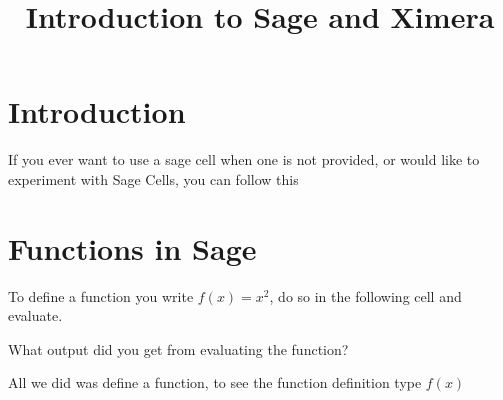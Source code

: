 \documentclass{ximera}
\title{Introduction to Sage and Ximera}
\begin{document}
\maketitle
\section{Introduction}
If you ever want to use a sage cell when one is not provided, or would like to experiment with Sage Cells, you can follow this 
\section{Functions in Sage}
To define a function you write $f(x)=x^2$, do so in the following cell and evaluate.
\begin{onlineOnly}
\begin{sageCell}

\end{sageCell}
\end{onlineOnly}
\begin{question}
What output did you get from evaluating the function?
\begin{multipleChoice}
\end{multipleChoice}
\begin{feedback}
All we did was define a function, to see the function definition type $f(x)$
\end{feedback}
\end{question}
\end{document}
